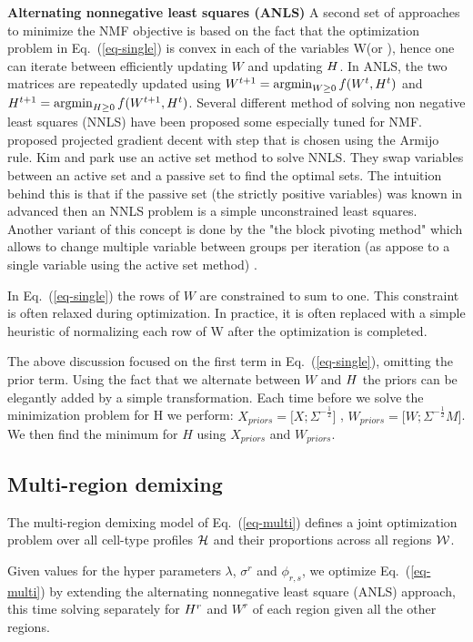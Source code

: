 \documentclass{article} %
\newcommand{\W}{W}
\renewcommand{\eqref}[1]{Eq.~(\ref{#1})}
\begin{document}
{\bf{Alternating nonnegative least squares} (ANLS)} A second set of approaches to minimize the NMF objective is based on the fact that the optimization problem in \eqref{eq-single} is convex in each of the variables \W (or \Htext), hence one can iterate between efficiently updating $\W$ and updating ${H}$. In ANLS, the two matrices are  repeatedly updated using $ W^{t+1} = \argmin_{W \geq 0 } f(W^t, H^t)$ and $H^{t+1} = \argmin_{H \geq 0 } f(W^{t+1},H^t)$. Several different method of solving non negative least squares (NNLS) have been proposed some especially tuned for NMF. \citet{lin2007projected} proposed projected gradient decent with step that is chosen using the Armijo rule. 
Kim and park \cite{kim2008activeset,kim2011fast} use an active set method to solve NNLS. They swap variables between an active set and a passive set to find the optimal sets. The intuition behind this is that if the passive set (the strictly positive variables) was known in advanced then an NNLS problem is a simple unconstrained least squares. Another variant of this concept is done by the "the block pivoting method" which allows to change multiple variable between groups per iteration (as appose to a single variable using the active set method) \cite{kim2011fast}.

In \eqref{eq-single} the rows of $\W$ are constrained to sum to one. This constraint is often relaxed during optimization. In practice, it is often replaced with a simple heuristic of normalizing each row of W after the optimization is completed. 

The above discussion focused on the first term in \eqref{eq-single}, omitting the prior term. Using the fact that we alternate between $\W$ and ${H}$ the priors can be elegantly added by a simple transformation. Each time before we solve the minimization problem for H we perform:
$ X_{priors} = \Big[ X ;\Sigma^{-\frac{1}{2}} \Big]  $  ,  $ \W_{priors} = \Big[  \W ; \Sigma^{-\frac{1}{2}} M \Big]  $. We then find the minimum for $H$ using $X_{priors} $ and $W_{priors} $. 

\subsection{Multi-region demixing}
The multi-region demixing model of \eqref{eq-multi} defines a joint optimization problem over all cell-type profiles $\cal{{H}}$ and their proportions across all regions $\cal{\W}$.

Given values for the hyper parameters $\lambda$, $\sigma^r$ and $\phi_{r,s}$, 
we optimize \eqref{eq-multi} by extending the alternating nonnegative least square (ANLS) approach, this time solving separately for ${{H}^r}$ and ${\W^r}$ of each region given all the other regions. %
\end{document}
